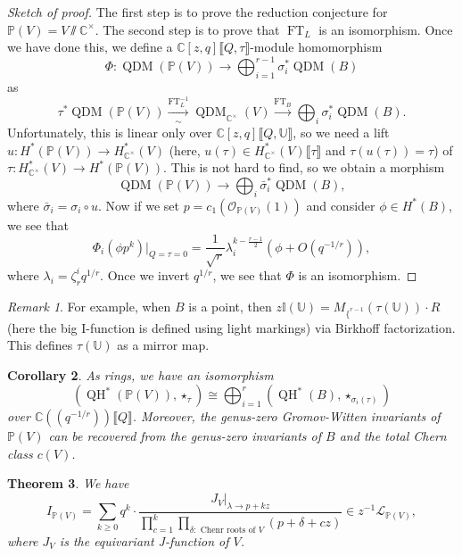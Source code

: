 \documentclass{amsart}
\newtheorem{thm}{Theorem}[section]
\newtheorem{cor}[thm]{Corollary}
\theoremstyle{definition}
\theoremstyle{remark}
\newtheorem{rmk}[thm]{Remark}
\theoremstyle{plain}
\theoremstyle{definition}
\theoremstyle{remark}
\newcommand{\C}{\mathbb{C}}
\renewcommand{\P}{\mathbb{P}}
\renewcommand{\mc}[1]{\mathcal{#1}}
\newcommand{\1}{\mathbf{1}}
\newcommand{\2}{\mathbf{2}}
\newcommand{\3}{\mathbf{3}}
\newcommand{\ps}[1]{\lBrack #1 \rBrack}
\newcommand{\ls}[1]{(\!( #1 )\!)}
\DeclareMathOperator{\QH}{QH}
\DeclareMathOperator{\QDM}{QDM}
\DeclareMathOperator{\FT}{FT}
\begin{document}
\begin{proof}[Sketch of proof]
    The first step is to prove the reduction conjecture for \(\P(V) = V \sslash \C^{\times}\). The second step is to prove that \(\FT_L\) is an isomorphism. Once we have done this, we define a \(\C[z,q]\ps{Q, \tau}\)-module homomorphism
    \[ \Phi \colon \QDM(\P(V)) \to \bigoplus_{i=1}^{r-1}\sigma_i^* \QDM(B) \]
    as
    \[ \tau^* \QDM(\P(V)) \xrightarrow[\sim]{\FT_L^{-1}} \QDM_{\C^{\times}}(V) \xrightarrow{\FT_B} \bigoplus_i \sigma_i^* \QDM(B). \]
    Unfortunately, this is linear only over \(\C[z,q]\ps{Q, \mathbb{U}}\), so we need a lift \(u \colon H^*(\P(V)) \to H^*_{\C^{\times}}(V)\) (here, \(u(\tau) \in H^*_{\C^{\times}}(V) \ps{\tau}\) and \(\tau(u(\tau)) = \tau\)) of \(\tau \colon H^*_{\C^{\times}}(V) \to H^*(\P(V))\). This is not hard to find, so we obtain a morphism
    \[ \QDM(\P(V)) \to \bigoplus_i \bar{\sigma}_i^* \QDM(B), \]
    where \(\bar{\sigma}_i = \sigma_i \circ u\). Now if we set \(p = c_1(\mc{O}_{\P(V)}(1))\) and consider \(\phi \in H^*(B)\), we see that
    \[ \Phi_i(\phi p^k)|_{Q = \tau = 0} = \frac{1}{\sqrt{r}} \lambda_i^{k- \frac{r-1}{2}} (\phi + O(q^{-1/r})), \]
    where \(\lambda_i = \zeta_r^i q^{1/r}\). Once we invert \(q^{1/r}\), we see that \(\Phi\) is an isomorphism.
\end{proof}

\begin{rmk}
    For example, when \(B\) is a point, then \(z \mathbb{I}(\mathbb{U}) = M_{\{^{r-1}} (\tau(\mathbb{U})) \cdot R\) (here the big I-function is defined using light markings) via Birkhoff factorization. This defines \(\tau(\mathbb{U})\) as a mirror map.
\end{rmk}

\begin{cor}
As rings, we have an isomorphism
        \[ (\QH^*(\P(V)), \star_{\tau}) \cong \bigoplus_{i=1}^r (\QH^*(B), \star_{\sigma_i(\tau)}) \]
        over \(\C \ls{q^{-1/r}}\ps{Q}\).
Moreover, the genus-zero Gromov-Witten invariants of \(\P(V)\) can be recovered from the genus-zero invariants of \(B\) and the total Chern class \(c(V)\).
\end{cor}

\begin{thm}
    We have
    \[ I_{\P(V)} = \sum_{k \geq 0} q^k \cdot \frac{J_V|_{\lambda \to p + kz}}{\prod_{c=1}^k \prod_{\delta: \text{ Chenr roots of }V} (p + \delta + cz)} \in z^{-1} \mc{L}_{\P(V)}, \]
    where \(J_V\) is the equivariant J-function of \(V\).
\end{thm}
\end{document}
